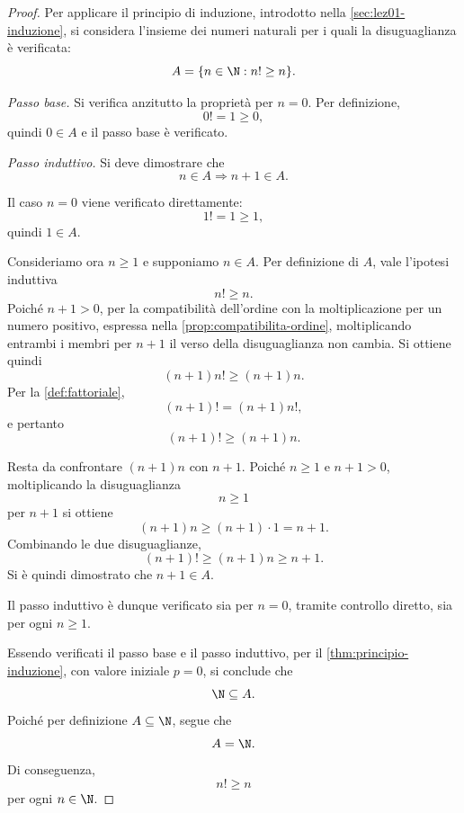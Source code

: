 \begin{proof}
Per applicare il principio di induzione, introdotto nella
\cref{sec:lez01-induzione}, si considera l'insieme dei numeri naturali
per i quali la disuguaglianza è verificata:
\[
  A=\{n\in\N:n!\ge n\}.
\]

\emph{Passo base.}
Si verifica anzitutto la proprietà per \(n=0\). Per definizione,
\[
  0!=1\ge0,
\]
quindi \(0\in A\) e il passo base è verificato.

\emph{Passo induttivo.}
Si deve dimostrare che
\[
  n\in A\Longrightarrow n+1\in A.
\]

Il caso \(n=0\) viene verificato direttamente:
\[
  1!=1\ge1,
\]
quindi \(1\in A\).

Consideriamo ora \(n\ge1\) e supponiamo \(n\in A\). Per definizione di
\(A\), vale l'ipotesi induttiva
\[
  n!\ge n.
\]
Poiché \(n+1>0\), per la compatibilità dell'ordine con la
moltiplicazione per un numero positivo, espressa nella
\cref{prop:compatibilita-ordine}, moltiplicando entrambi i membri per
\(n+1\) il verso della disuguaglianza non cambia. Si ottiene quindi
\[
  (n+1)n!\ge(n+1)n.
\]
Per la \cref{def:fattoriale},
\[
  (n+1)!=(n+1)n!,
\]
e pertanto
\[
  (n+1)!\ge(n+1)n.
\]

Resta da confrontare \((n+1)n\) con \(n+1\). Poiché \(n\ge1\) e
\(n+1>0\), moltiplicando la disuguaglianza
\[
  n\ge1
\]
per \(n+1\) si ottiene
\[
  (n+1)n\ge(n+1)\cdot1=n+1.
\]
Combinando le due disuguaglianze,
\[
  (n+1)!
  \ge(n+1)n
  \ge n+1.
\]
Si è quindi dimostrato che \(n+1\in A\).

Il passo induttivo è dunque verificato sia per \(n=0\), tramite controllo
diretto, sia per ogni \(n\ge1\).

Essendo verificati il passo base e il passo induttivo, per il
\cref{thm:principio-induzione}, con valore iniziale \(p=0\), si conclude
che
\[
  \N\subseteq A.
\]
Poiché per definizione \(A\subseteq\N\), segue che
\[
  A=\N.
\]
Di conseguenza,
\[
  n!\ge n
\]
per ogni \(n\in\N\).
\end{proof}
